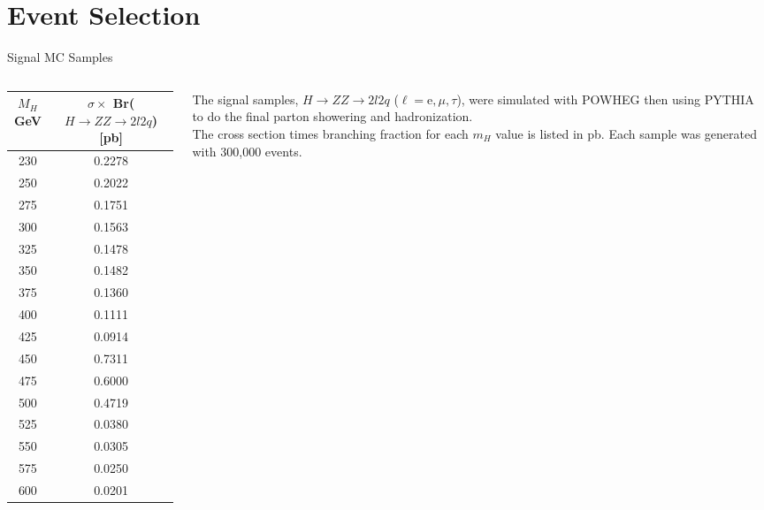 \section{Event Selection}

\begin{frame}{Signal MC Samples}
\begin{columns}
      \begin{column}{0.5\textwidth}
\begin{center}
\footnotesize
\begin{tabular}{|c|c|}
\hline
$M_H$ GeV & $\sigma\times$ Br($H \rightarrow ZZ \rightarrow 2l2q$) [pb] \\ \hline
 230  &  0.2278  \\ %
 250  &  0.2022 \\ %
 275  &  0.1751  \\ %
 300  &  0.1563  \\ %
 325  &  0.1478  \\ %
 350  &  0.1482  \\         
 375  &  0.1360  \\       
 400  &  0.1111 \\ %
 425  &  0.0914 \\ %
 450  &  0.7311 \\ %
 475  &  0.6000 \\ %
 500  &  0.4719 \\ %
  525  &  0.0380 \\ %
  550  &  0.0305 \\ %
 575  &  0.0250 \\ %
  600  &  0.0201 \\ \hline 
 
\end{tabular}
\end{center}

\end{column}
\begin{column}{0.5\textwidth}
The signal samples, $H \rightarrow ZZ \rightarrow 2l2q$ ($\ell = \mathrm{e}, \mu, \tau$), were simulated with POWHEG then using PYTHIA to do the final parton showering and hadronization.
\\
\vspace{1em}
The cross section times branching fraction for each $m_H$ value is listed in pb. Each sample was generated with 300,000 events.
    \end{column}
  \end{columns}
\end{frame}






